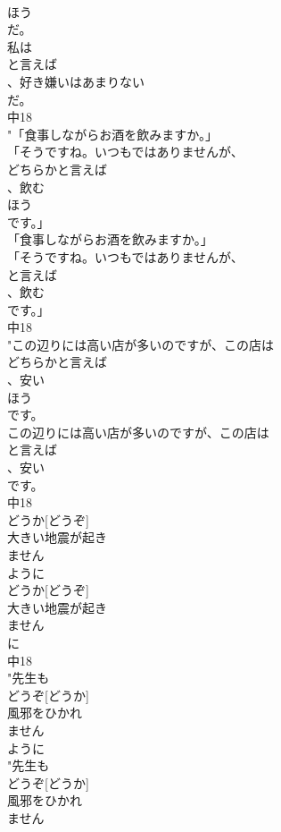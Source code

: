 \documentclass[8pt]{extreport}
\begin{document}
\begin{CJK}{UTF8}{min}
\\	ほう
\\	だ。
\\	私は
\\	と言えば
\\	、好き嫌いはあまりない
\\	だ。
\\	中18
\\	"「食事しながらお酒を飲みますか。」
\\	「そうですね。いつもではありませんが、
\\	どちらかと言えば
\\	、飲む
\\	ほう
\\	です。」
\\	「食事しながらお酒を飲みますか。」
\\	「そうですね。いつもではありませんが、
\\	と言えば
\\	、飲む
\\	です。」
\\	中18
\\	"この辺りには高い店が多いのですが、この店は
\\	どちらかと言えば
\\	、安い
\\	ほう
\\	です。
\\	この辺りには高い店が多いのですが、この店は
\\	と言えば
\\	、安い
\\	です。
\\	中18
\\	どうか[どうぞ]
\\	大きい地震が起き
\\	ません
\\	ように
\\	どうか[どうぞ]
\\	大きい地震が起き
\\	ません
\\	に
\\	中18
\\	"先生も
\\	どうぞ[どうか]
\\	風邪をひかれ
\\	ません
\\	ように
\\	"先生も
\\	どうぞ[どうか]
\\	風邪をひかれ
\\	ません

\end{CJK}
\end{document}
